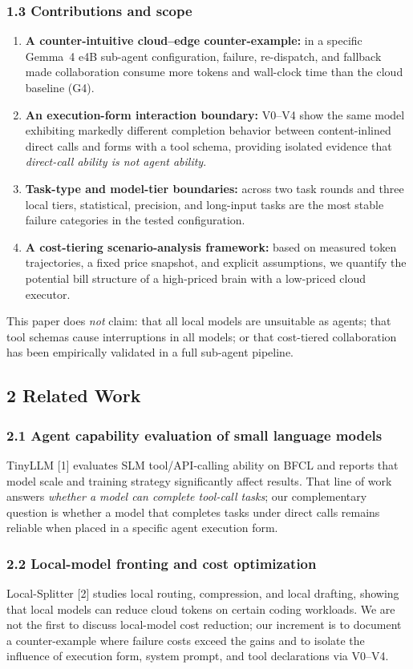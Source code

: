 \documentclass[
]{article}
\begin{document}
\subsubsection{1.3 Contributions and scope}
\begin{enumerate}
\item \textbf{A counter-intuitive cloud--edge counter-example:} in a specific Gemma~4 e4B sub-agent configuration, failure, re-dispatch, and fallback made collaboration consume more tokens and wall-clock time than the cloud baseline (G4).
\item \textbf{An execution-form interaction boundary:} V0--V4 show the same model exhibiting markedly different completion behavior between content-inlined direct calls and forms with a tool schema, providing isolated evidence that \emph{direct-call ability is not agent ability}.
\item \textbf{Task-type and model-tier boundaries:} across two task rounds and three local tiers, statistical, precision, and long-input tasks are the most stable failure categories in the tested configuration.
\item \textbf{A cost-tiering scenario-analysis framework:} based on measured token trajectories, a fixed price snapshot, and explicit assumptions, we quantify the potential bill structure of a high-priced brain with a low-priced cloud executor.
\end{enumerate}

This paper does \emph{not} claim: that all local models are unsuitable as agents; that tool schemas cause interruptions in all models; or that cost-tiered collaboration has been empirically validated in a full sub-agent pipeline.

\subsection{2 Related Work}
\subsubsection{2.1 Agent capability evaluation of small language models}
TinyLLM [1] evaluates SLM tool/API-calling ability on BFCL and reports that model scale and training strategy significantly affect results. That line of work answers \emph{whether a model can complete tool-call tasks}; our complementary question is whether a model that completes tasks under direct calls remains reliable when placed in a specific agent execution form.

\subsubsection{2.2 Local-model fronting and cost optimization}
Local-Splitter [2] studies local routing, compression, and local drafting, showing that local models can reduce cloud tokens on certain coding workloads. We are not the first to discuss local-model cost reduction; our increment is to document a counter-example where failure costs exceed the gains and to isolate the influence of execution form, system prompt, and tool declarations via V0--V4.
\end{document}
